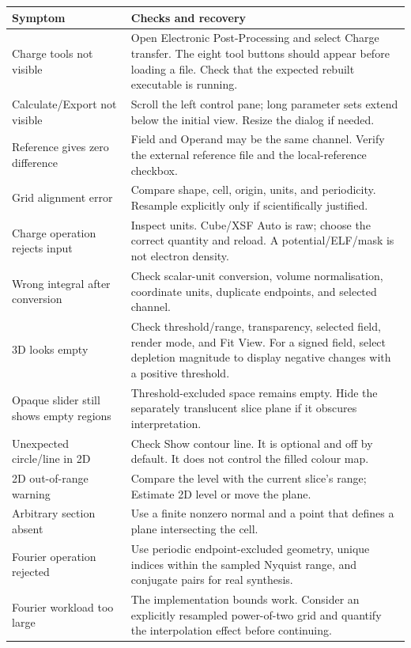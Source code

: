 \begin{longtable}{p{.30\linewidth}p{.61\linewidth}}
\toprule Symptom & Checks and recovery \\ \midrule\endhead
Charge tools not visible & Open Electronic Post-Processing and select Charge transfer. The eight tool buttons should appear before loading a file. Check that the expected rebuilt executable is running. \\
Calculate/Export not visible & Scroll the left control pane; long parameter sets extend below the initial view. Resize the dialog if needed. \\
Reference gives zero difference & Field and Operand may be the same channel. Verify the external reference file and the local-reference checkbox. \\
Grid alignment error & Compare shape, cell, origin, units, and periodicity. Resample explicitly only if scientifically justified. \\
Charge operation rejects input & Inspect units. Cube/XSF Auto is raw; choose the correct quantity and reload. A potential/ELF/mask is not electron density. \\
Wrong integral after conversion & Check scalar-unit conversion, volume normalisation, coordinate units, duplicate endpoints, and selected channel. \\
3D looks empty & Check threshold/range, transparency, selected field, render mode, and Fit View. For a signed field, select depletion magnitude to display negative changes with a positive threshold. \\
Opaque slider still shows empty regions & Threshold-excluded space remains empty. Hide the separately translucent slice plane if it obscures interpretation. \\
Unexpected circle/line in 2D & Check Show contour line. It is optional and off by default. It does not control the filled colour map. \\
2D out-of-range warning & Compare the level with the current slice's range; Estimate 2D level or move the plane. \\
Arbitrary section absent & Use a finite nonzero normal and a point that defines a plane intersecting the cell. \\
Fourier operation rejected & Use periodic endpoint-excluded geometry, unique indices within the sampled Nyquist range, and conjugate pairs for real synthesis. \\
Fourier workload too large & The implementation bounds work. Consider an explicitly resampled power-of-two grid and quantify the interpolation effect before continuing. \\

\end{longtable}
